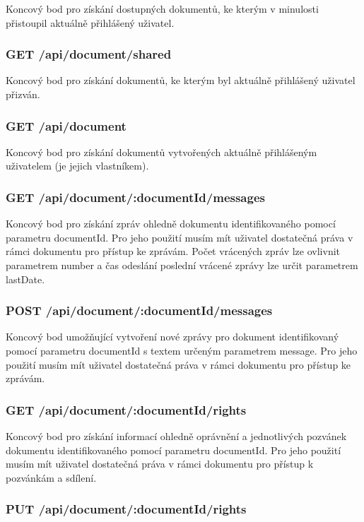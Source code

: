 Koncový bod pro získání dostupných dokumentů, ke kterým v minulosti přistoupil aktuálně přihlášený uživatel.

\subsubsection{GET /api/document/shared}

Koncový bod pro získání dokumentů, ke kterým byl aktuálně přihlášený uživatel přizván.

\subsubsection{GET /api/document}

Koncový bod pro získání dokumentů vytvořených aktuálně přihlášeným uživatelem (je jejich vlastníkem).

\subsubsection{GET /api/document/:documentId/messages}

Koncový bod pro získání zpráv ohledně dokumentu identifikovaného pomocí parametru documentId.
Pro jeho použití musím mít uživatel dostatečná práva v rámci dokumentu pro přístup ke zprávám.
Počet vrácených zpráv lze ovlivnit parametrem number a čas odeslání poslední vrácené zprávy lze určit parametrem lastDate.

\subsubsection{POST /api/document/:documentId/messages}
Koncový bod umožňující vytvoření nové zprávy pro dokument identifikovaný pomocí parametru documentId s textem určeným parametrem message.
Pro jeho použití musím mít uživatel dostatečná práva v rámci dokumentu pro přístup ke zprávám.

\subsubsection{GET /api/document/:documentId/rights}

Koncový bod pro získání informací ohledně oprávnění a jednotlivých pozvánek dokumentu identifikovaného pomocí parametru documentId.
Pro jeho použití musím mít uživatel dostatečná práva v rámci dokumentu pro přístup k pozvánkám a sdílení.

\subsubsection{PUT /api/document/:documentId/rights}

